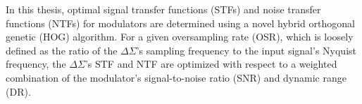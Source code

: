 In this thesis, optimal signal transfer functions (STFs) and noise transfer functions
(NTFs) for \DS modulators are determined using a novel hybrid orthogonal genetic (HOG)
algorithm. For a given oversampling rate (OSR), which is loosely defined as the
ratio of the $\Delta\Sigma$'s sampling frequency to the input signal's Nyquist frequency,
the $\Delta\Sigma$'s STF and NTF are optimized with respect to a weighted combination of
the \DS modulator's signal-to-noise ratio (SNR) and dynamic range (DR).